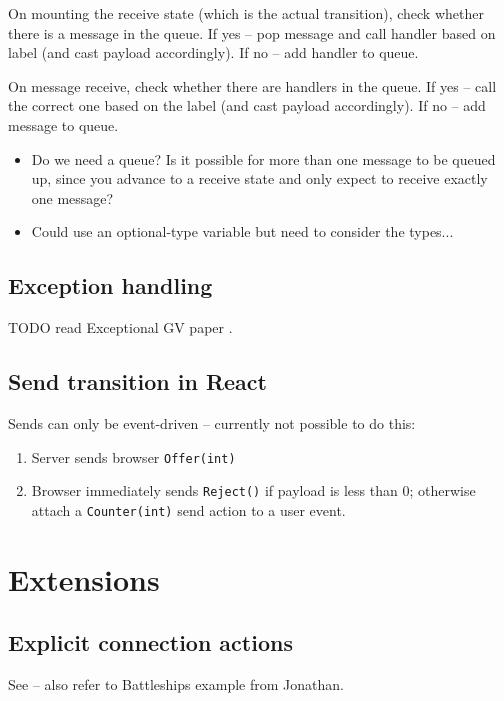 \documentclass{article}
\begin{document}
On mounting the receive state (which is the actual
transition), check whether there is a message in the 
queue.
If yes -- pop message and call handler based on label
(and cast payload accordingly).
If no -- add handler to queue.

On message receive, check whether there are handlers
in the queue. 
If yes -- call the correct one based on
the label (and cast payload accordingly).
If no -- add message to queue.

\begin{itemize}
\item
Do we need a queue? Is it possible for more than
one message to be queued up, since you advance to
a receive state and only expect to receive exactly
one message? 

\item
Could use an optional-type variable
but need to consider the types...
\end{itemize}

\subsection*{Exception handling}

TODO read Exceptional GV paper \cite{ExceptionalGV}.

\subsection*{Send transition in React}
Sends can only be event-driven --
currently not possible to do this:

\begin{enumerate}
\item Server sends browser 
\texttt{Offer(int)}
\item Browser immediately sends 
\texttt{Reject()} if payload is less than 0;
otherwise attach a \texttt{Counter(int)} 
send action to a user event.
\end{enumerate}

\section{Extensions}

\subsection*{Explicit connection actions}

See \cite{FASE2017} -- also refer to Battleships 
example from Jonathan.
\end{document}
